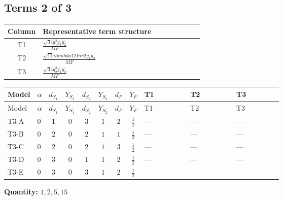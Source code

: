 \documentclass[8pt]{article}
\begin{document}
\begin{landscape}
\subsection*{Terms 2 of 3}
\begin{center}
\begin{tabular}{@{}c >{\raggedright\arraybackslash}p{0.82\linewidth}@{}}
\toprule
Column & Representative term structure \\
\midrule
T1 & \(\displaystyle \frac{\sqrt{3} i g_{1}^{2} \overline{y_{1}} \overline{y_{2}}}{MF}\) \\
\midrule
T2 & \(\displaystyle \frac{\sqrt{11} i lambda12Inv2 \overline{y_{1}} \overline{y_{2}}}{MF}\) \\
\midrule
T3 & \(\displaystyle \frac{\sqrt{3} i g_{2}^{2} \overline{y_{1}} \overline{y_{2}}}{MF}\) \\
\midrule
\bottomrule
\end{tabular}
\end{center}
\smallskip
\tiny
\begin{longtable}{@{}llcccccc >{\raggedright\arraybackslash}p{0.21\linewidth} >{\raggedright\arraybackslash}p{0.21\linewidth} >{\raggedright\arraybackslash}p{0.21\linewidth}@{}}
\toprule
Model & $\alpha$ & $d_{S_1}$ & $Y_{S_1}$ & $d_{S_2}$ & $Y_{S_2}$ & $d_F$ & $Y_F$ & T1 & T2 & T3 \\
\midrule
\endfirsthead
\toprule
Model & $\alpha$ & $d_{S_1}$ & $Y_{S_1}$ & $d_{S_2}$ & $Y_{S_2}$ & $d_F$ & $Y_F$ & T1 & T2 & T3 \\
\midrule
\endhead
T3-A & $0$ & $1$ & $0$ & $3$ & $1$ & $2$ & $\frac{1}{2}$ & --- & --- & --- \\
\midrule
T3-B & $0$ & $2$ & $0$ & $2$ & $1$ & $1$ & $\frac{1}{2}$ & --- & --- & --- \\
\midrule
T3-C & $0$ & $2$ & $0$ & $2$ & $1$ & $3$ & $\frac{1}{2}$ & --- & --- & --- \\
\midrule
T3-D & $0$ & $3$ & $0$ & $1$ & $1$ & $2$ & $\frac{1}{2}$ & --- & --- & --- \\
\midrule
T3-E & $0$ & $3$ & $0$ & $3$ & $1$ & $2$ & $\frac{1}{2}$ & \scriptsize\adjustbox{max width=\linewidth}{$\begin{gathered} \frac{\sqrt{3} i g_{1}^{2} \overline{y_{1}} \overline{y_{2}}}{8 MF}\end{gathered}$} & \scriptsize\adjustbox{max width=\linewidth}{$\begin{gathered} \frac{3 \sqrt{11} i lambda12Inv2 \overline{y_{1}} \overline{y_{2}}}{22 MF}\end{gathered}$} & \scriptsize\adjustbox{max width=\linewidth}{$\begin{gathered} \frac{15 \sqrt{3} i g_{2}^{2} \overline{y_{1}} \overline{y_{2}}}{8 MF}\end{gathered}$} \\
\midrule
\bottomrule
\end{longtable}
\clearpage
\noindent\textbf{Quantity: }$\mathrm{1,2,5,15}$\par\smallskip

\end{landscape}
\end{document}
